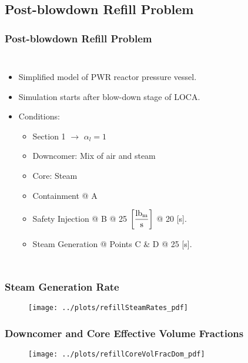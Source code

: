 \documentclass[compress,xcolor=table]{beamer}
\begin{document}
\subsection[Post-blowdown Refill Problem]{Post-blowdown Refill Problem}
\begin{frame}
\frametitle{Post-blowdown Refill Problem}
\begin{columns}
\begin{itemize}
\item{Simplified model of PWR reactor pressure vessel.}
\item{Simulation starts after blow-down stage of LOCA.}
\item{Conditions:
\begin{itemize}
\item{Section 1 $\rightarrow$ $\alpha_{l} = 1$}
\item{Downcomer: Mix of air and steam}
\item{Core: Steam}
\item{Containment @ A}
\item{Safety Injection @ B @ 25 $\displaystyle \left[ \frac{\lbm{}}{\text{s}} \right]$ @ 20 [s].}
\item{Steam Generation @ Points C \& D @ 25 [s].}
\end{itemize}
}
\end{itemize}


\begin{figure}[h!t]
\centering
\resizebox{!}{0.65\textheight}{}
\end{figure}
\end{columns}

\end{frame}
\begin{frame}
\frametitle{Steam Generation Rate}

\begin{figure}[h!t]
\centering
\texttt{[image: ../plots/refillSteamRates\_pdf]}
\end{figure}

\end{frame}
\begin{frame}
\frametitle{Downcomer and Core Effective Volume Fractions}

\begin{figure}[h!t]
\centering
\texttt{[image: ../plots/refillCoreVolFracDom\_pdf]}
\end{figure}

\end{frame}
\end{document}
